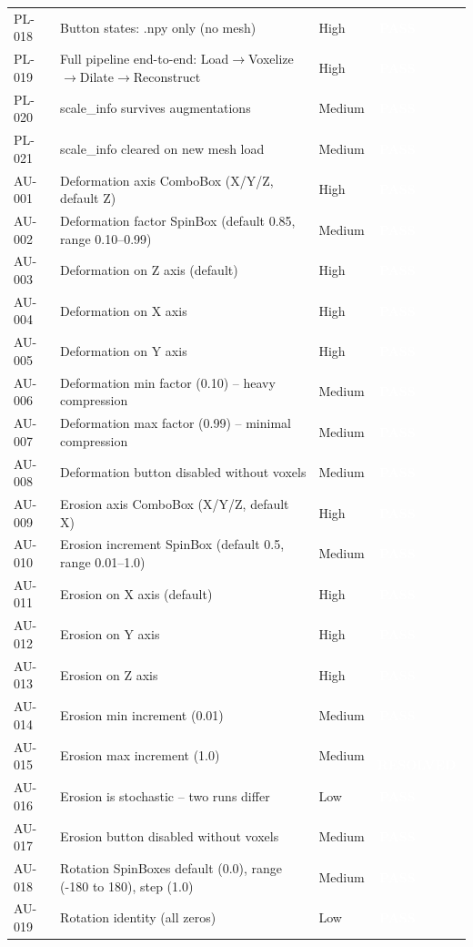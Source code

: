 \documentclass[12pt,a4paper]{article}
\newcommand{\statuspass}{\colorbox{statusgreen}{\textcolor{white}{\textbf{\,PASS\,}}}}
\newcommand{\statusresolved}{\colorbox{statusorange}{\textcolor{white}{\textbf{\,RESOLVED\,}}}}
\begin{document}
{\begin{longtable}{p{1.7cm}p{7.7cm}p{1.3cm}p{2cm}}
PL-018 & Button states: .npy only (no mesh) & High & \statuspass \\
PL-019 & Full pipeline end-to-end: Load$\rightarrow$Voxelize$\rightarrow$Dilate$\rightarrow$Reconstruct & High & \statuspass \\
PL-020 & scale\_info survives augmentations & Medium & \statuspass \\
PL-021 & scale\_info cleared on new mesh load & Medium & \statuspass \\
AU-001 & Deformation axis ComboBox (X/Y/Z, default Z) & High & \statuspass \\
AU-002 & Deformation factor SpinBox (default 0.85, range 0.10--0.99) & Medium & \statuspass \\
AU-003 & Deformation on Z axis (default) & High & \statuspass \\
AU-004 & Deformation on X axis & High & \statuspass \\
AU-005 & Deformation on Y axis & High & \statuspass \\
AU-006 & Deformation min factor (0.10) -- heavy compression & Medium & \statuspass \\
AU-007 & Deformation max factor (0.99) -- minimal compression & Medium & \statuspass \\
AU-008 & Deformation button disabled without voxels & Medium & \statuspass \\
AU-009 & Erosion axis ComboBox (X/Y/Z, default X) & High & \statuspass \\
AU-010 & Erosion increment SpinBox (default 0.5, range 0.01--1.0) & Medium & \statuspass \\
AU-011 & Erosion on X axis (default) & High & \statuspass \\
AU-012 & Erosion on Y axis & High & \statuspass \\
AU-013 & Erosion on Z axis & High & \statuspass \\
AU-014 & Erosion min increment (0.01) & Medium & \statuspass \\
AU-015 & Erosion max increment (1.0) & Medium & \statusresolved \\
AU-016 & Erosion is stochastic -- two runs differ & Low & \statuspass \\
AU-017 & Erosion button disabled without voxels & Medium & \statuspass \\
AU-018 & Rotation SpinBoxes default (0.0), range (-180 to 180), step (1.0) & Medium & \statuspass \\
AU-019 & Rotation identity (all zeros) & Low & \statuspass \\

\end{longtable}}
\end{document}
